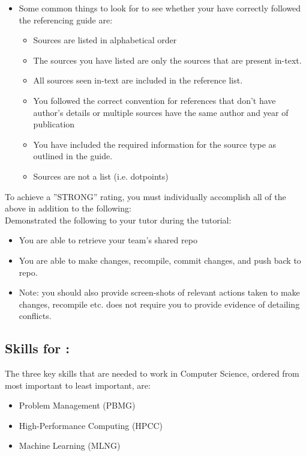 \documentclass[a4paper, 11pt]{report}
\begin{document}
\begin{itemize}
\begin{itemize}
	\item Some common things to look for to see whether your have correctly followed the referencing guide are:
		\begin{itemize}
		\item Sources are listed in alphabetical order
		\item The sources you have listed are only the sources that are present in-text.
		\item All sources seen in-text are included in the reference list.
		\item You followed the correct convention for references that don’t have author’s details or multiple sources have the same author and year of publication
		\item You have included the required information for the source type as outlined in the guide.
		\item Sources are not a list (i.e. dotpoints)
		\end{itemize}
	\end{itemize}
\end{itemize}

To achieve a ''STRONG'' rating, you must individually accomplish all of the above in addition to the following:\\
Demonstrated the following to your tutor during the tutorial:
\begin{itemize}
\item You are able to retrieve your team’s shared repo
\item You are able to make changes, recompile, commit changes, and push back to repo.
\item Note: you should also provide screen-shots of relevant actions taken to make changes, recompile etc. does not require you to provide evidence of detailing conflicts.
\end{itemize}



\subsection{Skills for \majA: \studA}

The three key skills that are needed to work in Computer Science, ordered from most important to least important, are:
\begin{itemize}
\item Problem Management (PBMG)
\item High-Performance Computing (HPCC)
\item Machine Learning (MLNG)
\end {itemize}
\end{document}
